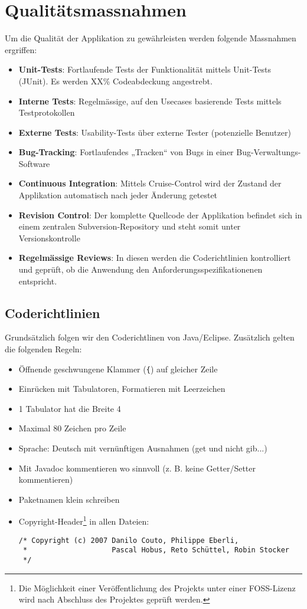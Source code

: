 \documentclass[a4paper,12pt,halfparskip,DIV14]{scrartcl}
\begin{document}
\section{Qualitätsmassnahmen}

Um die Qualität der Applikation zu gewährleisten werden folgende Massnahmen ergriffen:
\begin{itemize}
	\item \textbf{Unit-Tests}: Fortlaufende Tests der Funktionalität mittels Unit-Tests (JUnit). Es werden XX\% Codeabdeckung angestrebt.
	\item \textbf{Interne Tests}: Regelmässige, auf den Usecases basierende Tests mittels Testprotokollen
	\item \textbf{Externe Tests}: Usability-Tests über externe Tester (potenzielle Benutzer)
	\item \textbf{Bug-Tracking}: Fortlaufendes „Tracken“ von Bugs in einer Bug-Verwaltungs-Software
	\item \textbf{Continuous Integration}: Mittels Cruise-Control wird der Zustand der Applikation automatisch nach jeder Änderung getestet
	\item \textbf{Revision Control}: Der komplette Quellcode der Applikation befindet sich in einem zentralen Subversion-Repository und steht somit unter Versionskontrolle
	\item \textbf{Regelmässige Reviews}: In diesen werden die Coderichtlinien kontrolliert und geprüft, ob die Anwendung den Anforderungsspezifikationenen entspricht. 
\end{itemize}

\subsection{Coderichtlinien}\label{sub:coderichtlinien} %

Grundsätzlich folgen wir den Coderichtlinen von Java/Eclipse. Zusätzlich gelten die folgenden Regeln:

\begin{itemize}
  \item Öffnende geschwungene Klammer (\texttt{\{}) auf gleicher Zeile
  \item Einrücken mit Tabulatoren, Formatieren mit Leerzeichen
  \item 1 Tabulator hat die Breite 4
  \item Maximal 80 Zeichen pro Zeile
  \item Sprache: Deutsch mit vernünftigen Ausnahmen (get und nicht gib...)
  \item Mit Javadoc kommentieren wo sinnvoll (z. B. keine Getter/Setter kommentieren)
  \item Paketnamen klein schreiben
  \item Copyright-Header\footnote{Die Möglichkeit einer Veröffentlichung des Projekts unter einer FOSS-Lizenz wird nach Abschluss des Projektes geprüft werden.} in allen Dateien:
    \begin{verbatim}
/* Copyright (c) 2007 Danilo Couto, Philippe Eberli,
 *                    Pascal Hobus, Reto Schüttel, Robin Stocker
 */
    \end{verbatim}
\end{itemize}
\end{document}
